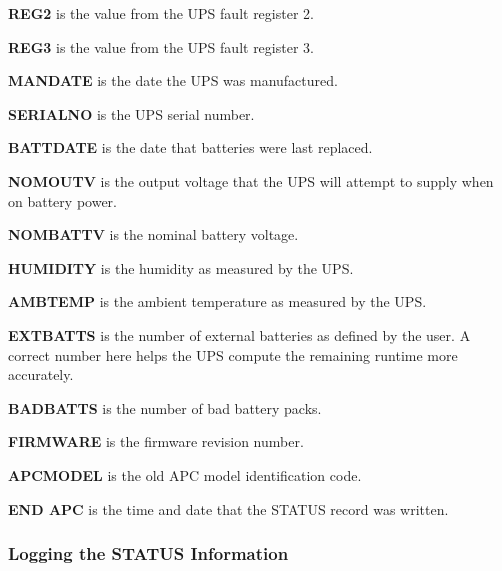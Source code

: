 {{{{{{{{{{{{{{{\begin{description}
\item {\bf REG2}
is the value from the UPS fault register 2.  

\item {\bf REG3}
is the value from the UPS fault register 3.  

\item {\bf MANDATE}
is the date the UPS was manufactured.  

\item {\bf SERIALNO}
is the UPS serial number.  

\item {\bf BATTDATE}
is the date that batteries were last replaced.  

\item {\bf NOMOUTV}
is the output voltage that the UPS will attempt to supply when on battery
power.  

\item {\bf NOMBATTV}
is the nominal battery voltage.  

\item {\bf HUMIDITY}
is the humidity as measured by the UPS.  

\item {\bf AMBTEMP}
is the ambient temperature as measured by the UPS.  

\item {\bf EXTBATTS}
is the number of external batteries as defined by the user. A correct number
here helps the UPS compute the remaining runtime more accurately.  

\item {\bf BADBATTS}
is the number of bad battery packs.  

\item {\bf FIRMWARE}
is the firmware revision number.  

\item {\bf APCMODEL}
is the old APC model identification code.  

\item {\bf END APC}
is the time and date that the STATUS record was written. 
\end{description}

\label{Logging-the-STATUS-Information}

\subsubsection*{Logging the STATUS Information}

}}}}}}}}}}}}}}}
